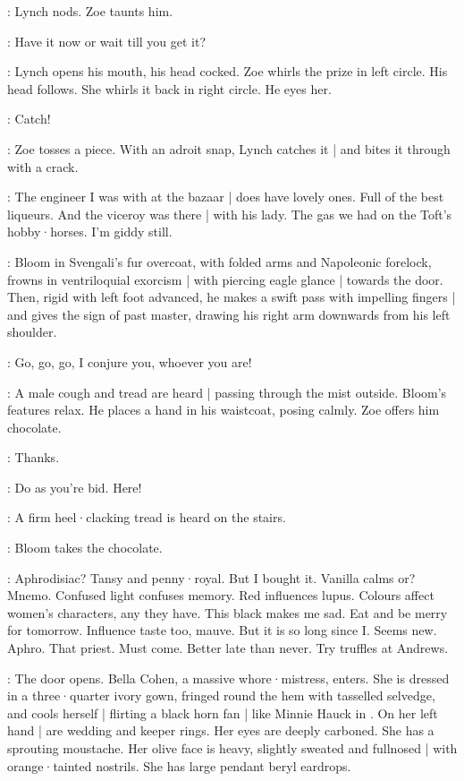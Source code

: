 :
Lynch nods.
Zoe taunts him.

\Zoe:
Have it now or wait till you get it?

:
Lynch opens his mouth,
his head cocked.
Zoe whirls the prize in left circle.
His head follows.
She whirls it back in right circle.
He eyes her.

\Zoe:
Catch!

:
Zoe tosses a piece.
With an adroit snap,
Lynch catches it |
and bites it through with a crack.

\Kitty:
The engineer I was with at the bazaar |
does have lovely ones.
Full of the best liqueurs.
And the viceroy was there |
with his lady.
The gas we had on the Toft's hobby·horses.
I'm giddy still.

:
Bloom in Svengali's fur overcoat,
with folded arms and Napoleonic forelock,
frowns in ventriloquial exorcism |
with piercing eagle glance |
towards the door.
Then,
rigid with left foot advanced,
he makes a swift pass with impelling fingers |
and gives the sign of past master,
drawing his right arm downwards from his left shoulder.

\Bloom:
Go,
go,
go,
I conjure you,
whoever you are!

:
A male cough and tread are heard |
passing through the mist outside.
Bloom's features relax.
He places a hand in his waistcoat,
posing calmly.
Zoe offers him chocolate.

\Bloom:
Thanks.

\Zoe:
Do as you're bid.
Here!

:
A firm heel·clacking tread is heard on the stairs.

:
Bloom takes the chocolate.

\Bloom:
Aphrodisiac?
Tansy and penny·royal.
But I bought it.
Vanilla calms or?
Mnemo.
Confused light confuses memory.
Red influences lupus.
Colours affect women's characters,
any they have.
This black makes me sad.
Eat and be merry for tomorrow.
Influence taste too,
mauve.
But it is so long since I.
Seems new.
Aphro.
That priest.
%
Must come.
Better late than never.
Try truffles at Andrews.

:
The door opens.
Bella Cohen,
a massive whore·mistress,
enters.
She is dressed in a three·quarter ivory gown,
fringed round the hem with tasselled selvedge,
and cools herself |
flirting a black horn fan |
like Minnie Hauck in .
On her left hand |
are wedding and keeper rings.
Her eyes are deeply carboned.
She has a sprouting moustache.
Her olive face is heavy,
slightly sweated and fullnosed |
with orange·tainted nostrils.
She has large pendant beryl eardrops.

